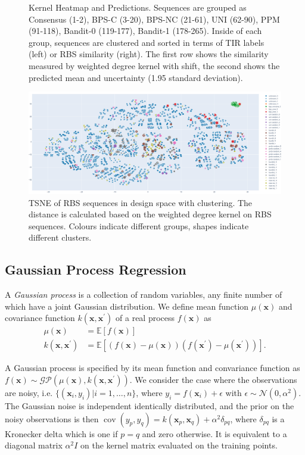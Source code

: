 \begin{figure}
    \caption{Kernel Heatmap and Predictions. Sequences are grouped as Consensus (1-2), BPS-C (3-20), BPS-NC (21-61), UNI (62-90), PPM (91-118), Bandit-0 (119-177), Bandit-1 (178-265). Inside of each group, sequences are clustered and sorted in terms of TIR labels (left) or RBS similarity (right). The first row shows the similarity measured by weighted degree kernel with shift, the second shows the predicted mean and uncertainty (1.95 standard deviation).}
\end{figure}

\begin{figure}
    \centering
    \includegraphics[scale = 0.25]{plots/Supplementary/clustering.png}
    \caption{TSNE of RBS sequences in design space with clustering. The distance is calculated based on the weighted degree kernel on RBS sequences. Colours indicate different groups, shapes indicate different clusters.}
\end{figure}

\subsection{Gaussian Process Regression}

A \textit{Gaussian process} is a collection of random variables, any finite number of which have a joint Gaussian distribution. 
We define mean function $\mu(\mathbf{x})$  and covariance function $k(\mathbf{x}, \mathbf{x}^\prime)$ of a real process $f(\mathbf{x})$ as
\begin{align}
    \mu(\mathbf{x}) &= \mathbb{E}[f(\mathbf{x})]\\
    k(\mathbf{x}, \mathbf{x}^\prime) &= \mathbb{E}[(f(\mathbf{x}) - \mu(\mathbf{x}))(f(\mathbf{x}^\prime) - \mu(\mathbf{x}^\prime))].
\end{align}

A Gaussian process is specified by its mean function and convariance function as $f(\mathbf{x}) \sim \mathcal{G} \mathcal{P}\left(\mu(\mathbf{x}), k\left(\mathbf{x}, \mathbf{x}^{\prime}\right)\right)$.
We consider the case where the observations are noisy, i.e. $\{(\mathbf{x}_i, y_i)| i = 1, \dots, n\}$, where $y_i = f(\mathbf{x}_i) + \epsilon$ with $\epsilon \sim \mathcal{N}(0, \alpha^2)$. 
The Gaussian noise is independent identically distributed, and the prior on the noisy observations is then $\operatorname{cov}\left(y_{p}, y_{q}\right)=k\left(\mathbf{x}_{p}, \mathbf{x}_{q}\right)+\alpha^{2} \delta_{p q}$,
where $\delta_{pq}$ is a Kronecker delta which is one if $p = q$ and zero otherwise.
It is equivalent to a diagonal matrix $\alpha^2 I$ on the kernel matrix evaluated on the training points.

